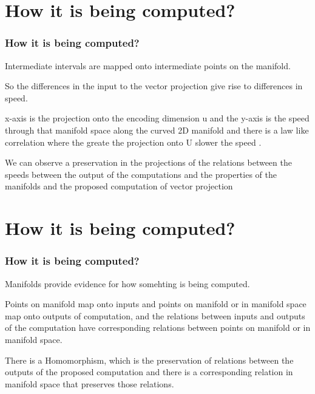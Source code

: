 \documentclass{beamer}
\begin{document}
\section{How it is being computed?}
\begin{frame}
\frametitle{\textbf{How it is being computed?} }
Intermediate intervals are mapped onto intermediate points on the manifold.


So the differences in the input to the vector projection give rise to differences in speed.


x-axis is the projection onto the encoding dimension u and the y-axis is the speed through that manifold space along the curved 2D manifold and there is a law like correlation where the greate the projection onto U slower the speed .

We can observe a preservation in the projections of the relations between the speeds between the output of the computations and the properties of the manifolds and the proposed computation of vector projection

\end{frame}


\section{How it is being computed?}
\begin{frame}
\frametitle{\textbf{How it is being computed?} }
Manifolds provide evidence for how somehting is being computed.

Points on manifold map onto inputs and points on manifold or in manifold space map onto outputs of computation, and the relations between inputs and outputs of the computation have corresponding relations between points on manifold or in manifold space.

There is a Homomorphism, which is the preservation of relations between the outputs of the proposed computation and there is a corresponding relation in manifold space that preserves those relations.

\end{frame}
\end{document}
